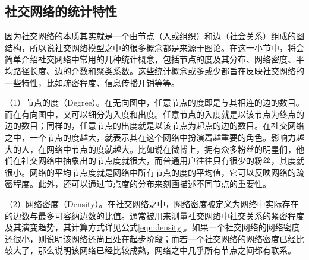 

\subsection{社交网络的统计特性}

因为社交网络的本质其实就是一个由节点（人或组织）和边（社会关系）组成的图结构，所以说社交网络模型之中的很多概念都是来源于图论。在这一小节中，将会简单介绍社交网络中常用的几种统计概念，包括节点的度及其分布、网络密度、平均路径长度、边的介数和聚类系数。这些统计概念或多或少都旨在反映社交网络的一些特性，比如疏密程度、信息传播开销等等。

（1）节点的度（Degree）。在无向图中，任意节点的度即是与其相连的边的数目。而在有向图中，又可以细分为入度和出度。任意节点的入度就是以该节点为终点的边的数目；同样的，任意节点的出度就是以该节点为起点的边的数目。在社交网络之中，一个节点的度越大，就表示其在这个网络中扮演着越重要的角色。影响力越大的人，在网络中节点的度就越大。比如说在微博上，拥有众多粉丝的明星们，他们在社交网络中抽象出的节点度就很大，而普通用户往往只有很少的粉丝，其度就很小。网络的平均节点度就是网络中所有节点的度的平均值，它可以反映网络的疏密程度。此外，还可以通过节点度的分布来刻画描述不同节点的重要性。

（2）网络密度（Density）。在社交网络之中，网络密度被定义为网络中实际存在的边数与最多可容纳边数的比值。通常被用来测量社交网络中社交关系的紧密程度及其演变趋势，其计算方式详见公式\ref{eqn:density}。如果一个社交网络的网络密度还很小，则说明该网络还尚且处在起步阶段；而若一个社交网络的网络密度已经比较大了，那么说明该网络已经比较成熟，网络之中几乎所有节点之间都有联系。

